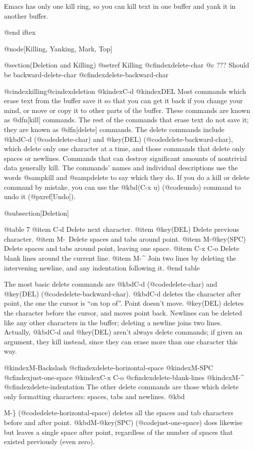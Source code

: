 {{{{{  Emacs has only one kill ring, so you can kill text in one buffer and
yank it in another buffer.

@end iftex

@node[Killing, Yanking, Mark, Top]

@section(Deletion and Killing)
@setref Killing
@cfindex{delete-char}
@c ??? Should be backward-delete-char
@cfindex{delete-backward-char}

@cindex{killing}@cindex{deletion}
@kindex{C-d}
@kindex{DEL}
  Most commands which erase text from the buffer save it so that you can
get it back if you change your mind, or move or copy it to other parts of
the buffer.  These commands are known as @dfn[kill] commands.  The rest of
the commands that erase text do not save it; they are known as @dfn[delete]
commands.  The delete commands include @kbd{C-d} (@code{delete-char}) and
@key(DEL) (@code{delete-backward-char}), which 
delete only one character at a time, and those commands that delete only
spaces or newlines.  Commands that can destroy significant amounts of
nontrivial data generally kill.  The commands' names and individual
descriptions use the words @samp{kill} and @samp{delete} to say which they
do.  If you do a kill or delete command by mistake, you can use the
@kbd(C-x u) (@code{undo}) command to undo it (@pxref[Undo]).

@subsection[Deletion]

@table 7
@item C-d
Delete next character.
@item @key(DEL)
Delete previous character.
@item M-\
Delete spaces and tabs around point.
@item M-@key(SPC)
Delete spaces and tabs around point, leaving one space.
@item C-x C-o
Delete blank lines around the current line.
@item M-^
Join two lines by deleting the intervening newline, and any indentation
following it.
@end table

  The most basic delete commands are @kbd{C-d} (@code{delete-char})
and @key(DEL) (@code{delete-backward-char}).  @kbd{C-d} deletes the
character after point, the one the cursor is ``on top of''.  Point
doesn't move.  @key(DEL) deletes the character before the cursor,
and moves point back.  Newlines can be deleted like any other
characters in the buffer; deleting a newline joins two lines.
Actually, @kbd{C-d} and @key(DEL) aren't always delete commands; if
given an argument, they kill instead, since they can erase more than
one character this way.

@kindex{M-Backslash}
@cfindex{delete-horizontal-space}
@kindex{M-SPC}
@cfindex{just-one-space}
@kindex{C-x C-o}
@cfindex{delete-blank-lines}
@kindex{M-^}
@cfindex{delete-indentation}
  The other delete commands are those which delete only formatting
characters: spaces, tabs and newlines.  @kbd{M-\}
(@code{delete-horizontal-space}) deletes all the spaces and tab
characters before and after point.  @kbd{M-@key(SPC)} (@code{just-one-space})
does likewise but leaves a single space after point, regardless of the
number of spaces that existed previously (even zero).

}}}}}}
